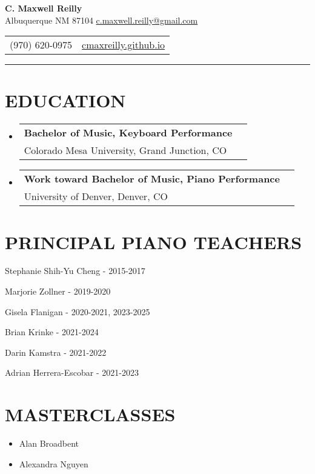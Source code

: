 \documentclass{article}
\makeatletter
\newcommand{\cvItem}[1]{
        \item {
            {#1}
        }
    }
\newcommand{\cvSubHeadingListStart}{\begin{itemize}[leftmargin=0pt]}
\newcommand{\cvSubHeadingListEnd}{\end{itemize}}
\newcommand{\cvItemListStart}{\begin{itemize}[leftmargin=10pt]}
\newcommand{\cvItemListEnd}{\end{itemize}}
\newcommand{\cvEducationSubheading}[2]{
        \vspace{-1pt}\item[]
            \begin{tabular*}{1\textwidth}[t]{l@{\extracolsep{\fill}}r}
                \textbf{#1} \\
                {#2} \\
            \end{tabular*}
    }
\makeatother
\begin{document}
    \begin{center}
        \textbf{\Large C. Maxwell Reilly} \\ Albuquerque NM 87104
        \href{mailto:c.maxwell.reilly@gmail.com}{c.maxwell.reilly@gmail.com}
    \end{center}\vspace{-11pt}
    \begin{center}
        \begin{tabular}{c c}
            (970) 620-0975 & \href{https://cmaxreilly.github.io}{cmaxreilly.github.io} \\
        \end{tabular}\vspace{-8pt}
    \end{center}
    \rule{\textwidth}{1pt}

    \section{EDUCATION}
        \cvSubHeadingListStart
            \cvEducationSubheading
                {Bachelor of Music, Keyboard Performance}
                {Colorado Mesa University, Grand Junction, CO}
            \cvEducationSubheading
                {Work toward Bachelor of Music, Piano Performance}
                {University of Denver, Denver, CO}
        \cvSubHeadingListEnd

    \section{PRINCIPAL PIANO TEACHERS}
        \cvItemListStart
            \begin{multicols}{2}
                \cvItem{Stephanie Shih-Yu Cheng - 2015-2017}
                \cvItem{Marjorie Zollner - 2019-2020}
                \cvItem{Gisela Flanigan - 2020-2021, 2023-2025} 
                \cvItem{Brian Krinke - 2021-2024}
                \cvItem{Darin Kamstra - 2021-2022}
                \cvItem{Adrian Herrera-Escobar - 2021-2023}
            \end{multicols}
        \cvItemListEnd

    \section{MASTERCLASSES}
        \cvItemListStart
            \cvItem{Alan Broadbent}
            \cvItem{Alexandra Nguyen}
        \cvItemListEnd
\end{document}

